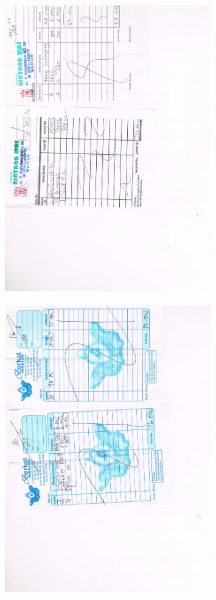 \documentclass{article} %
\begin{document}
	\begin{figure}[H]
		\centering
		\includegraphics[width=0.8\textwidth]{images/komponen1}
	\end{figure}

	\begin{figure}[H]
		\centering
		\includegraphics[width=0.8\textwidth]{images/komponen2}
	\end{figure}
\end{document}
